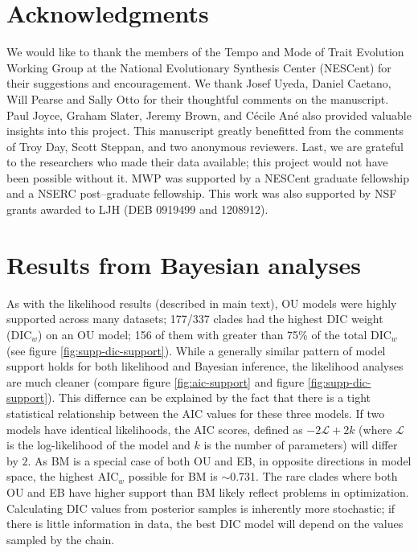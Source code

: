 \documentclass[a4paper,11pt]{article}
\begin{document}
\section{Acknowledgments}
We would like to thank the members of the Tempo and Mode of Trait Evolution Working Group at the National Evolutionary Synthesis Center (NESCent) for their suggestions and encouragement. We thank Josef Uyeda, Daniel Caetano, Will Pearse and Sally Otto for their thoughtful comments on the manuscript. Paul Joyce, Graham Slater, Jeremy Brown, and C\'{e}cile An\'{e} also provided valuable insights into this project. This manuscript greatly benefitted from the comments of Troy Day, Scott Steppan, and two anonymous reviewers. Last, we are grateful to the researchers who made their data available; this project would not have been possible without it. MWP was supported by a NESCent graduate fellowship and a NSERC post--graduate fellowship. This work was also supported by NSF grants awarded to LJH (DEB 0919499 and 1208912).

 
\newpage



\newpage

\section{Results from Bayesian analyses}
As with the likelihood results (described in main text), OU models were highly supported across many datasets; 
177/337 clades had the highest DIC weight (DIC$_w$) on an OU model; 156 of them with greater than 75\% of the total DIC$_w$ (see figure \ref{fig:supp-dic-support}). While a generally similar pattern of model support holds for both likelihood and Bayesian inference, the likelihood analyses are much cleaner (compare figure \ref{fig:aic-support} and figure \ref{fig:supp-dic-support}). This differnce can be explained by the fact that there is a tight statistical relationship between the AIC values for these three models. If two models have identical likelihoods, the AIC scores, defined as $-2\mathcal{L} + 2k$ (where $\mathcal{L}$ is the log-likelihood of the model and $k$ is the number of parameters) will differ by $2$. As BM is a special case of both OU and EB, in opposite directions in model space, the highest AIC$_w$ possible for BM is $\sim$0.731. The rare clades where both OU and EB have higher support than BM likely reflect problems in optimization. Calculating DIC values from posterior samples is inherently more stochastic; if there is little information in data, the best DIC model will depend on the values sampled by the chain. 
\end{document}
